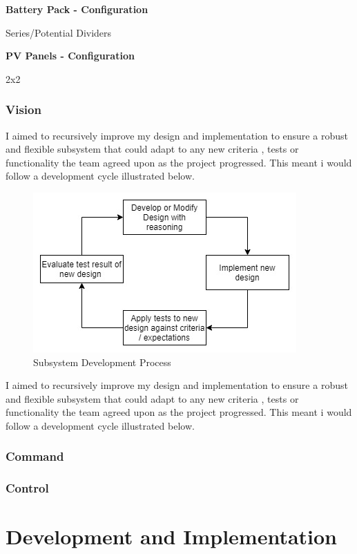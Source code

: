 \documentclass[10pt,twoside]{article}
\begin{document}
\textbf{Battery Pack - Configuration}

Series/Potential Dividers

\textbf{PV Panels - Configuration}

2x2
\newpage
\subsubsection{Vision}

I aimed to recursively improve my design and implementation to ensure a robust and flexible subsystem that could adapt to any new criteria , tests or functionality the team agreed upon as the project progressed. This meant i would follow a development cycle illustrated below.

\begin{figure}[hbt!]
    \centering
    \includegraphics[scale=0.40]{FlowOfDesign.jpg}
    \captionsetup{justification=centering}
    \caption{Subsystem Development Process}
\end{figure}

I aimed to recursively improve my design and implementation to ensure a robust and flexible subsystem that could adapt to any new criteria , tests or functionality the team agreed upon as the project progressed. This meant i would follow a development cycle illustrated below.


\subsubsection{Command}

\subsubsection{Control}

\newpage

\section{Development and Implementation}
\end{document}
